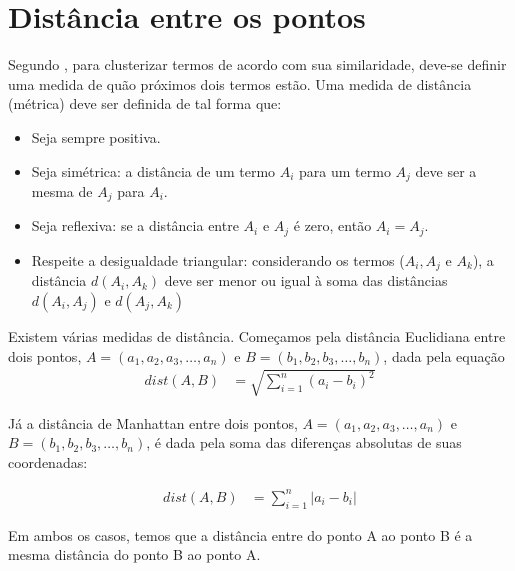 
\section{Distância entre os pontos}
\label{ssub:distância_entre_os_pontos}

Segundo , para clusterizar termos de acordo com sua similaridade, deve-se definir uma medida de quão próximos dois termos estão. Uma medida de distância (métrica) deve ser definida de tal forma que:

\begin{itemize}
  \item Seja sempre positiva.
  \item Seja simétrica: a distância de um termo \(A_{i}\) para um termo \(A_{j}\) deve ser a mesma de \(A_{j}\) para \(A_{i}\).
  \item Seja reflexiva: se a distância entre \(A_{i}\) e \(A_{j}\) é zero, então \(A_{i} = A_{j}\).
  \item Respeite a desigualdade triangular: considerando os termos (\(A_{i}, A_{j}\) e \(A_k\)), a distância \(d(A_{i}, A_k)\) deve ser menor ou igual à soma das distâncias \(d(A_{i}, A_{j})\) e \(d(A_{j}, A_k)\)
\end{itemize}

Existem várias medidas de distância. Começamos pela distância Euclidiana entre dois pontos, \(A=(a_1, a_2, a_3, \ldots, a_n) \) e \(B=(b_1, b_2, b_3, \ldots, b_n) \), dada pela equação
%
\begin{align}
  dist(A, B) &= \sqrt{\displaystyle\sum_{i=1}^{n} (a_i-b_i)^2} \label{eq:euclidean}
\end{align}

Já a distância de Manhattan entre dois pontos, \(A=(a_1, a_2, a_3, \ldots, a_n) \) e \(B=(b_1, b_2, b_3, \ldots, b_n) \), é dada pela soma das diferenças absolutas de suas coordenadas:

\begin{align}
  dist(A, B) &= \displaystyle\sum_{i=1}^{n} |a_i-b_i| \label{eq:manhattan}
\end{align}

Em ambos os casos, temos que a distância entre do ponto A ao ponto B é a mesma distância do ponto B ao ponto A.


